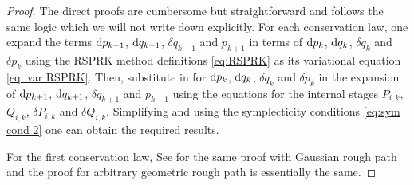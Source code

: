 \documentclass[11pt, oneside]{article}
\numberwithin{equation}{section}
\theoremstyle{definition}
\def\rmd{{\rm d}}
\begin{document}
\begin{proof}
    The direct proofs are cumbersome but straightforward and follows the same logic which we will not write down explicitly. For each conservation law, one expand the terms $\rmd p_{k+1}$, $\rmd q_{k+1}$, $\delta q_{k+1}$ and $p_{k+1}$ in terms of $\rmd p_k$, $\rmd q_k$, $\delta q_k$ and $\delta p_k$ using the RSPRK method definitions \eqref{eq:RSPRK} as its variational equation \eqref{eq: var RSPRK}. Then, substitute in for $\rmd p_k$, $\rmd q_k$, $\delta q_k$ and $\delta p_k$ in the expansion of $\rmd p_{k+1}$, $\rmd q_{k+1}$, $\delta q_{k+1}$ and $p_{k+1}$ using the equations for the internal stages $P_{i,k}$, $Q_{i,k}$, $\delta P_{i,k}$ and $\delta Q_{i,k}$. Simplifying and using the symplecticity conditions \eqref{eq:sym cond 2} one can obtain the required results.
    
    For the first conservation law, See \cite[Thm. 4.1]{HHW2018} for the same proof with Gaussian rough path and the proof for arbitrary geometric rough path is essentially the same. 
\end{proof}
\end{document}
